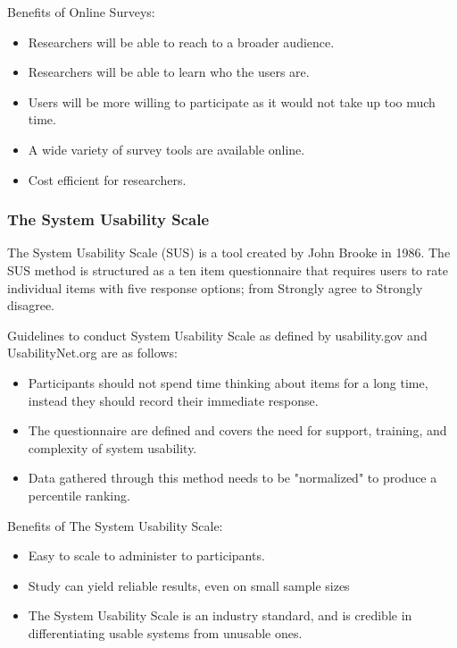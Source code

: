 \documentclass[10pt,journal,compsoc,draftclsnofoot]{IEEEtran}
\begin{document}
Benefits of Online Surveys:
\begin{itemize}
\item Researchers will be able to reach to a broader audience.
\item Researchers will be able to learn who the users are.
\item Users will be more willing to participate as it would not take up too much time.
\item A wide variety of survey tools are available online.
\item Cost efficient for researchers.
\end{itemize}

\subsubsection{The System Usability Scale ~\cite{userResearch}} 
The System Usability Scale (SUS) is a tool created by John Brooke in 1986.
The SUS method is structured as a ten item questionnaire that requires users to rate individual items with five response options; from Strongly agree to Strongly disagree.

Guidelines to conduct System Usability Scale as defined by usability.gov and UsabilityNet.org are as follows:
\begin{itemize}
\item Participants should not spend time thinking about items for a long time, instead they should record their immediate response. \cite{usabilitynet}
\item The questionnaire are defined and covers the need for support, training, and complexity of system usability.
\item Data gathered through this method needs to be "normalized" to produce a percentile ranking.
\end{itemize}

Benefits of The System Usability Scale:
\begin{itemize}
\item Easy to scale to administer to participants.
\item Study can yield reliable results, even on small sample sizes
\item The System Usability Scale is an industry standard, and is credible in differentiating usable systems from unusable ones.
\end{itemize}
\end{document}
